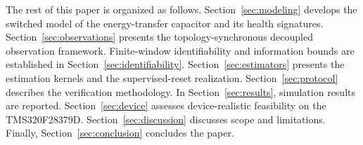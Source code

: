 The rest of this paper is organized as follows. Section~\ref{sec:modeling} develops the switched model of the energy-transfer capacitor and its health signatures. Section~\ref{sec:observations} presents the topology-synchronous decoupled observation framework. Finite-window identifiability and information bounds are established in Section~\ref{sec:identifiability}. Section~\ref{sec:estimators} presents the estimation kernels and the supervised-reset realization. Section~\ref{sec:protocol} describes the verification methodology. In Section~\ref{sec:results}, simulation results are reported. Section~\ref{sec:device} assesses device-realistic feasibility on the TMS320F28379D. Section~\ref{sec:discussion} discusses scope and limitations. Finally, Section~\ref{sec:conclusion} concludes the paper.
